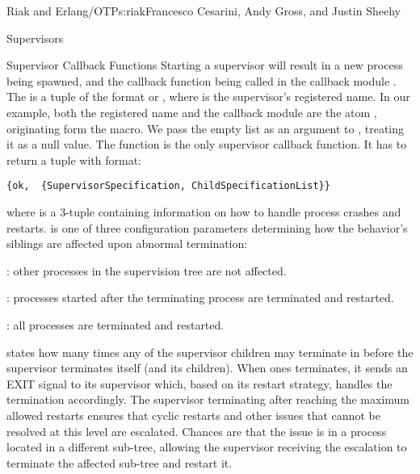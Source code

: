 \begin{aosachapter}{Riak and Erlang/OTP}{s:riak}{Francesco Cesarini, Andy Gross, and Justin Sheehy}
\begin{aosasect1}{Supervisors}
\begin{aosasect2}{Supervisor Callback Functions}
\noindent Starting a supervisor will result in a new process being spawned, and
the  callback function being called in the callback
module . The  is a tuple of
the format  or , where
 is the supervisor's registered name. In our example, both
the registered name and the callback module are the atom
, originating form the  macro. We
pass the empty list as an argument to , treating it as a
null value. The  function is the only supervisor callback
function. It has to return a tuple with format:

\begin{verbatim}
{ok,  {SupervisorSpecification, ChildSpecificationList}}
\end{verbatim}

\noindent where  is a 3-tuple 
 containing
information on how to handle process crashes and
restarts.  is one of three configuration
parameters determining how the behavior's siblings are affected upon
abnormal termination:

\begin{aosaitemize}

  \item {}: other processes in the supervision tree
  are not affected.

  \item {}: processes started after the terminating
  process are terminated and restarted.

  \item {}: all processes are terminated and restarted.

\end{aosaitemize}

 states how many times any of the supervisor
children may terminate in  before the supervisor
terminates itself (and its children).  When ones terminates,
it sends an EXIT signal to its
supervisor which, based on its restart strategy, handles the termination
accordingly. The supervisor terminating after reaching the maximum
allowed restarts ensures that cyclic restarts and other issues that
cannot be resolved at this level are escalated. Chances are that the
issue is in a process located in a different sub-tree, allowing the
supervisor receiving the escalation to terminate the affected sub-tree
and restart it.


\end{aosasect2}
\end{aosasect1}
\end{aosachapter}
